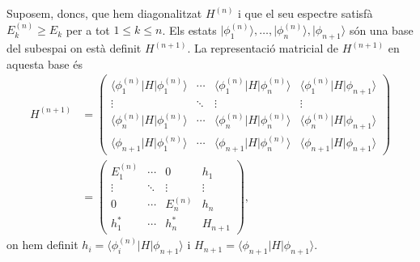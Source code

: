 \documentclass[12pt]{article}
\numberwithin{table}{section}
\numberwithin{figure}{section}
\numberwithin{equation}{section}
\newcommand{\ket}[1]{\vert {#1} \rangle}
\newcommand{\bra}[1]{\langle #1 \vert}
\begin{document}
Suposem, doncs, que hem diagonalitzat \( H^{(n)} \) i que el seu espectre satisfà \( E_k^{(n)} \geq E_k \) per a tot \( 1 \leq k \leq n \). Els estats \( \ket{\phi_1^{(n)}}, \dots, \ket{\phi_n^{(n)}}, \ket{\phi_{n + 1}} \) són una base del subespai on està definit \( H^{(n+1)} \). La representació matricial de \( H^{(n+1)} \) en aquesta base és 
\begin{align*}
	H^{(n+1)} & = \begin{pmatrix}
		\bra{\phi_1^{(n)}} H \ket{\phi_1^{(n)}} & \cdots & \bra{\phi_1^{(n)}} H \ket{\phi_n^{(n)}} & \bra{\phi_1^{(n)}} H \ket{\phi_{n+1}} \\
		\vdots & \ddots & \vdots & \vdots \\
		\bra{\phi_n^{(n)}} H \ket{\phi_1^{(n)}} & \cdots & \bra{\phi_n^{(n)}} H \ket{\phi_n^{(n)}} & \bra{\phi_{n}^{(n)}} H \ket{\phi_{n+1}} \\
		\bra{\phi_{n+1}} H \ket{\phi_1^{(n)}} & \cdots & \bra{\phi_{n+1}} H \ket{\phi_n^{(n)}} & \bra{\phi_{n+1}} H \ket{\phi_{n+1}}
	\end{pmatrix} \\
	& =
	\begin{pmatrix}
		E_1^{(n)} & \cdots & 0 & h_1 \\
		\vdots & \ddots & \vdots & \vdots \\
		0 & \cdots & E_n^{(n)} & h_n \\
		h_1^{\ast} & \cdots & h_n^{\ast} & H_{n+1}
	\end{pmatrix},
\end{align*}
on hem definit \( h_i = \bra{\phi_i^{(n)}} H \ket{\phi_{n+1}} \) i \( H_{n+1} = \bra{\phi_{n+1}} H \ket{\phi_{n+1}} \).
\end{document}
